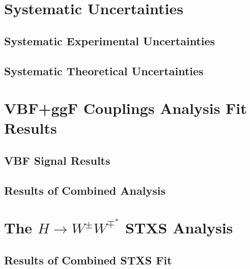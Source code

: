 \section{Systematic Uncertainties}
\subsection{Systematic Experimental Uncertainties}
\subsection{Systematic Theoretical Uncertainties}

\section{VBF+ggF Couplings Analysis Fit Results}
\subsection{VBF Signal Results}
\subsection{Results of Combined Analysis}

\section{The $H\rightarrow W^{\pm}W^{\mp^*}$ STXS Analysis}
\subsection{Results of Combined STXS Fit}
